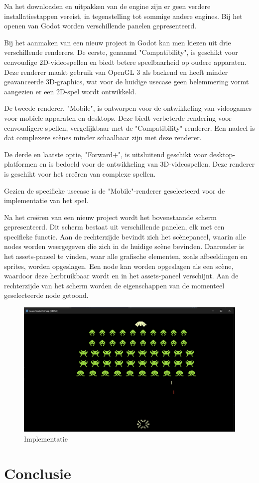 Na het downloaden en uitpakken van de engine zijn er geen verdere installatiestappen vereist, in tegenstelling tot sommige andere engines. Bij het openen van Godot worden verschillende panelen gepresenteerd.

Bij het aanmaken van een nieuw project in Godot kan men kiezen uit drie verschillende renderers. De eerste, genaamd "Compatibility", is geschikt voor eenvoudige 2D-videospellen en biedt betere speelbaarheid op oudere apparaten. Deze renderer maakt gebruik van OpenGL 3 als backend en heeft minder geavanceerde 3D-graphics, wat voor de huidige usecase geen belemmering vormt aangezien er een 2D-spel wordt ontwikkeld.

De tweede renderer, "Mobile", is ontworpen voor de ontwikkeling van videogames voor mobiele apparaten en desktops. Deze biedt verbeterde rendering voor eenvoudigere spellen, vergelijkbaar met de "Compatibility"-renderer. Een nadeel is dat complexere scènes minder schaalbaar zijn met deze renderer.

De derde en laatste optie, "Forward+", is uitsluitend geschikt voor desktop-platformen en is bedoeld voor de ontwikkeling van 3D-videospellen. Deze renderer is geschikt voor het creëren van complexe spellen.

Gezien de specifieke usecase is de "Mobile"-renderer geselecteerd voor de implementatie van het spel.

Na het creëren van een nieuw project wordt het bovenstaande scherm gepresenteerd. Dit scherm bestaat uit verschillende panelen, elk met een specifieke functie. Aan de rechterzijde bevindt zich het scènepaneel, waarin alle nodes worden weergegeven die zich in de huidige scène bevinden. Daaronder is het assets-paneel te vinden, waar alle grafische elementen, zoals afbeeldingen en sprites, worden opgeslagen. Een node kan worden opgeslagen als een scène, waardoor deze herbruikbaar wordt en in het assets-paneel verschijnt. Aan de rechterzijde van het scherm worden de eigenschappen van de momenteel geselecteerde node getoond.

\begin{figure}[h]
    \centering
    \includegraphics[width=1\textwidth]{ImplementatieSpel.png}
    \caption{Implementatie}
    \label{fig:POC}
\end{figure}

\section{Conclusie}
